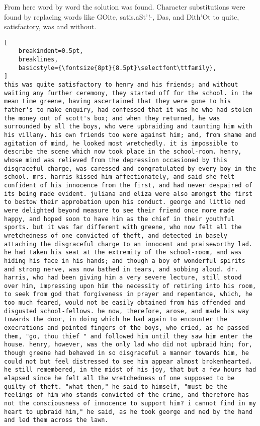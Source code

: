 \documentclass{uva-inf-bachelor-thesis}
\begin{document}
From here word by word the solution was found. Character substitutions were
found by replacing words like GOite, satis.aSt'!-, Das, and Dith'Ot to quite,
satisfactory, was and without.
\begin{lstlisting}[
    breakindent=0.5pt,
    breaklines,
    basicstyle={\fontsize{8pt}{8.5pt}\selectfont\ttfamily},
]
this was quite satisfactory to henry and his friends; and without waiting any further ceremony, they started off for the school. in the mean time greene, having ascertained that they were gone to his father's to make enquiry, had confessed that it was he who had stolen the money out of scott's box; and when they returned, he was surrounded by all the boys, who were upbraiding and taunting him with his villany. his own friends too were against him; and, from shame and agitation of mind, he looked most wretchedly. it is impossible to describe the scene which now took place in the school-room. henry, whose mind was relieved from the depression occasioned by this disgraceful charge, was caressed and congratulated by every boy in the school. mrs. harris kissed him affectionately, and said she felt confident of his innocence from the first, and had never despaired of its being made evident. juliana and eliza were also amongst the first to bestow their approbation upon his conduct. george and little ned were delighted beyond measure to see their friend once more made happy, and hoped soon to have him as the chief in their youthful sports. but it was far different with greene, who now felt all the wretchedness of one convicted of theft, and detected in basely attaching the disgraceful charge to an innocent and praiseworthy lad. he had taken his seat at the extremity of the school-room, and was hiding his face in his hands; and though a boy of wonderful spirits and strong nerve, was now bathed in tears, and sobbing aloud. dr. harris, who had been giving him a very severe lecture, still stood over him, impressing upon him the necessity of retiring into his room, to seek from god that forgiveness in prayer and repentance, which, he too much feared, would not be easily obtained from his offended and disgusted school-fellows. he now, therefore, arose, and made his way towards the door, in doing which he had again to encounter the execrations and pointed fingers of the boys, who cried, as he passed them, "go, thou thief " and followed him until they saw him enter the house. henry, however, was the only lad who did not upbraid him; for, though greene had behaved in so disgraceful a manner towards him, he could not but feel distressed to see him appear almost brokenhearted. he still remembered, in the midst of his joy, that but a few hours had elapsed since he felt all the wretchedness of one supposed to be guilty of theft. "what then," he said to himself, "must be the feelings of him who stands convicted of the crime, and therefore has not the consciousness of innocence to support him? i cannot find in my heart to upbraid him," he said, as he took george and ned by the hand and led them across the lawn. 
\end{lstlisting}
\end{document}
